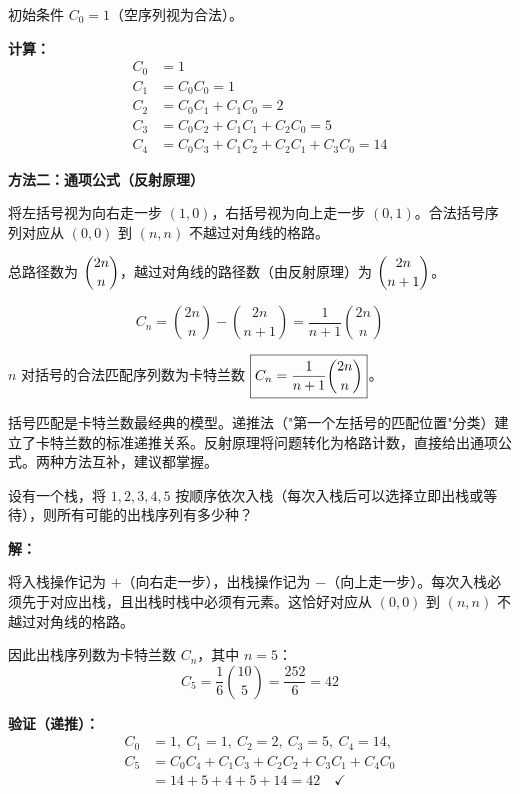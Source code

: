 \documentclass[12pt, a4paper]{ctexart}
\begin{document}
初始条件 \(C_0 = 1\)（空序列视为合法）。

\textbf{计算：}
\begin{align*}
C_0 &= 1 \\
C_1 &= C_0 C_0 = 1 \\
C_2 &= C_0 C_1 + C_1 C_0 = 2 \\
C_3 &= C_0 C_2 + C_1 C_1 + C_2 C_0 = 5 \\
C_4 &= C_0 C_3 + C_1 C_2 + C_2 C_1 + C_3 C_0 = 14
\end{align*}

\textbf{方法二：通项公式（反射原理）}

将左括号视为向右走一步 \((1,0)\)，右括号视为向上走一步 \((0,1)\)。合法括号序列对应从 \((0,0)\) 到 \((n,n)\) 不越过对角线的格路。

总路径数为 \(\dbinom{2n}{n}\)，越过对角线的路径数（由反射原理）为 \(\dbinom{2n}{n+1}\)。

\[
C_n = \binom{2n}{n} - \binom{2n}{n+1} = \frac{1}{n+1}\binom{2n}{n}
\]

\(n\) 对括号的合法匹配序列数为卡特兰数 \(\boxed{C_n = \dfrac{1}{n+1}\dbinom{2n}{n}}\)。

\begin{tipbox}[方法总结]
括号匹配是卡特兰数最经典的模型。递推法（"第一个左括号的匹配位置"分类）建立了卡特兰数的标准递推关系。反射原理将问题转化为格路计数，直接给出通项公式。两种方法互补，建议都掌握。
\end{tipbox}

\vspace{6pt}

\begin{examplebox}
设有一个栈，将 \(1,2,3,4,5\) 按顺序依次入栈（每次入栈后可以选择立即出栈或等待），则所有可能的出栈序列有多少种？
\end{examplebox}

\textbf{解：}

将入栈操作记为 \(+\)（向右走一步），出栈操作记为 \(-\)（向上走一步）。每次入栈必须先于对应出栈，且出栈时栈中必须有元素。这恰好对应从 \((0,0)\) 到 \((n,n)\) 不越过对角线的格路。

因此出栈序列数为卡特兰数 \(C_n\)，其中 \(n=5\)：
\[
C_5 = \frac{1}{6}\binom{10}{5} = \frac{252}{6} = \boxed{42}
\]

\textbf{验证（递推）：}
\begin{align*}
C_0&=1,\ C_1=1,\ C_2=2,\ C_3=5,\ C_4=14, \\
C_5 &= C_0 C_4 + C_1 C_3 + C_2 C_2 + C_3 C_1 + C_4 C_0 \\
&= 14 + 5 + 4 + 5 + 14 = 42 \quad \checkmark
\end{align*}
\end{document}
